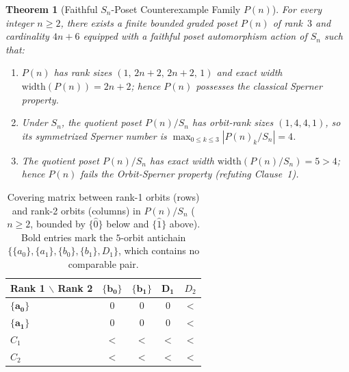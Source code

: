 \documentclass[11pt,a4paper]{article}
\newtheorem{theorem}{Theorem}[section]
\theoremstyle{definition}
\newcommand{\Sn}{S_n}
\newcommand{\width}{\mathrm{width}}
\begin{document}
\begin{theorem}[Faithful $\Sn$-Poset Counterexample Family $P(n)$]\label{thm:pn-counterexample}
For every integer $n \ge 2$, there exists a finite bounded graded poset $P(n)$ of rank~$3$ and cardinality $4n+6$ equipped with a faithful poset automorphism action of $\Sn$ such that:
\begin{enumerate}
  \item[(a)] $P(n)$ has rank sizes $(1,\, 2n+2,\, 2n+2,\, 1)$ and exact width $\width(P(n)) = 2n+2$; hence $P(n)$ possesses the classical Sperner property.
  \item[(b)] Under $\Sn$, the quotient poset $P(n)/\Sn$ has orbit-rank sizes $(1, 4, 4, 1)$, so its symmetrized Sperner number is $\max_{0 \le k \le 3} |P(n)_k/\Sn| = 4$.
  \item[(c)] The quotient poset $P(n)/\Sn$ has exact width $\width(P(n)/\Sn) = 5 > 4$; hence $P(n)$ fails the Orbit-Sperner property (refuting Clause~1).
\end{enumerate}
\end{theorem}

\begin{table}[ht]
\centering
\small
\caption{Covering matrix between rank-1 orbits (rows) and rank-2 orbits (columns) in $P(n)/\Sn$ ($n \ge 2$, bounded by $\{\hat{0}\}$ below and $\{\hat{1}\}$ above). Bold entries mark the $5$-orbit antichain $\{\{a_0\},\{a_1\},\{b_0\},\{b_1\},D_1\}$, which contains no comparable pair.}
\label{tab:pn-quotient}
\begin{tabular}{@{}lcccc@{}}
\toprule
\textbf{Rank 1 $\backslash$ Rank 2} & $\mathbf{\{b_0\}}$ & $\mathbf{\{b_1\}}$ & $\mathbf{D_1}$ & $D_2$ \\
\midrule
$\mathbf{\{a_0\}}$ & $0$ & $0$ & $0$ & $<$ \\
$\mathbf{\{a_1\}}$ & $0$ & $0$ & $0$ & $<$ \\
$C_1$              & $<$ & $<$ & $<$ & $<$ \\
$C_2$              & $<$ & $<$ & $<$ & $<$ \\
\bottomrule
\end{tabular}
\end{table}
\end{document}
